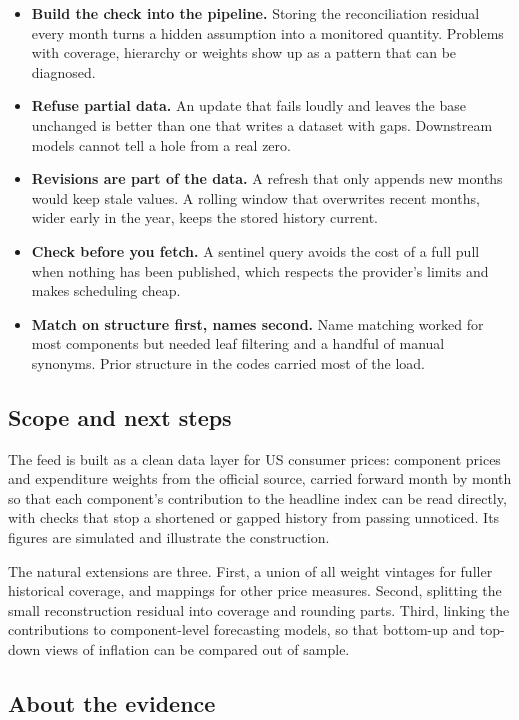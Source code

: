 \documentclass[
  british,
  a4paper,
]{article}
\providecommand{\tightlist}{%
  \setlength{\itemsep}{0pt}\setlength{\parskip}{0pt}}
\begin{document}
\begin{itemize}
\tightlist
\item
  \textbf{Build the check into the pipeline.} Storing the reconciliation
  residual every month turns a hidden assumption into a monitored
  quantity. Problems with coverage, hierarchy or weights show up as a
  pattern that can be diagnosed.
\item
  \textbf{Refuse partial data.} An update that fails loudly and leaves
  the base unchanged is better than one that writes a dataset with gaps.
  Downstream models cannot tell a hole from a real zero.
\item
  \textbf{Revisions are part of the data.} A refresh that only appends
  new months would keep stale values. A rolling window that overwrites
  recent months, wider early in the year, keeps the stored history
  current.
\item
  \textbf{Check before you fetch.} A sentinel query avoids the cost of a
  full pull when nothing has been published, which respects the
  provider's limits and makes scheduling cheap.
\item
  \textbf{Match on structure first, names second.} Name matching worked
  for most components but needed leaf filtering and a handful of manual
  synonyms. Prior structure in the codes carried most of the load.
\end{itemize}

\subsection{Scope and next steps}\label{scope-and-next-steps}

The feed is built as a clean data layer for US consumer prices:
component prices and expenditure weights from the official source,
carried forward month by month so that each component's contribution to
the headline index can be read directly, with checks that stop a
shortened or gapped history from passing unnoticed. Its figures are
simulated and illustrate the construction.

The natural extensions are three. First, a union of all weight vintages
for fuller historical coverage, and mappings for other price measures.
Second, splitting the small reconstruction residual into coverage and
rounding parts. Third, linking the contributions to component-level
forecasting models, so that bottom-up and top-down views of inflation
can be compared out of sample.

\subsection{About the evidence}\label{about-the-evidence}
\end{document}
